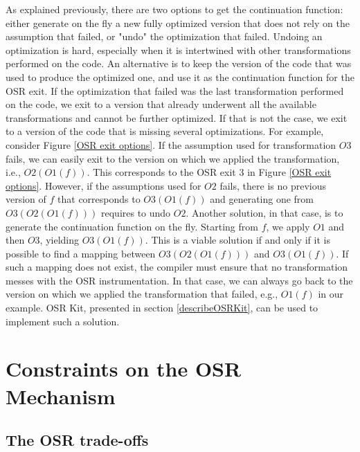 As explained previously, there are two options to get the continuation function: either generate on the fly a new fully optimized version that does not rely on the assumption that failed, or "undo" the optimization that failed.
Undoing an optimization is hard, especially when it is intertwined with other transformations performed on the code.
An alternative is to keep the version of the code that was used to produce the optimized one, and use it as the continuation function for the OSR exit.
If the optimization that failed was the last transformation performed on the code, we exit to a version that already underwent all the available transformations and cannot be further optimized.
If that is not the case, we exit to a version of the code that is missing several optimizations.
For example, consider Figure \ref{OSR exit options}. 
If the assumption used for transformation $O3$ fails, we can easily exit to the version on which we applied the transformation, i.e., $O2(O1(f))$.
This corresponds to the OSR exit 3 in Figure \ref{OSR exit options}.
However, if the assumptions used for $O2$ fails, there is no previous version of $f$ that corresponds to $O3(O1(f))$ and generating one from $O3(O2(O1(f)))$ requires to undo $O2$.
Another solution, in that case, is to generate the continuation function on the fly.
Starting from $f$, we apply $O1$ and then $O3$, yielding $O3(O1(f))$.
This is a viable solution if and only if it is possible to find a mapping between $O3(O2(O1(f)))$ and $O3(O1(f))$.
If such a mapping does not exist, the compiler must ensure that no transformation messes with the OSR instrumentation.
In that case, we can always go back to the version on which we applied the transformation that failed, e.g., $O1(f)$ in our example.
OSR Kit, presented in section \ref{describeOSRKit}, can be used to implement such a solution.\\

\section{Constraints on the OSR Mechanism}
\subsection{The OSR trade-offs}\label{tradeOffs}

